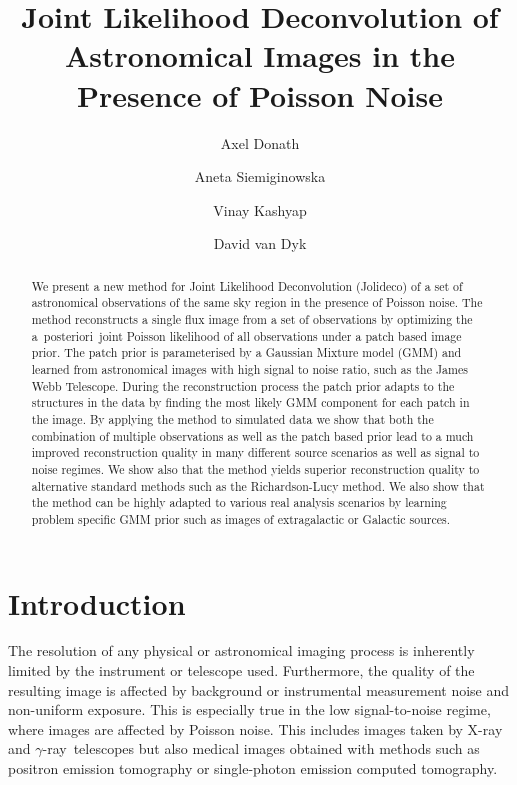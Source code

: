 \documentclass[twocolumn]{aastex631}
\newcommand{\aposteriori}{a~posteriori~}
\newcommand{\gammaray}{$\gamma$-ray\xspace}
\newcommand{\xray}{X-ray\xspace}
\begin{document}
    \title{Joint Likelihood Deconvolution of Astronomical Images in the Presence of Poisson Noise}

    \author[0000-0003-4568-7005]{Axel Donath}
    \author[0000-0002-0905-7375]{Aneta Siemiginowska}
    \author[0000-0002-3869-7996]{Vinay Kashyap} 
    \author[0000-0000-0000-0000]{David van Dyk}


    \begin{abstract}
        We present a new method for Joint Likelihood Deconvolution (Jolideco) of a set of astronomical observations of the same sky region in the presence of Poisson noise. The method reconstructs a single flux image from a set of observations by optimizing the \aposteriori joint Poisson likelihood of all observations under a patch based image prior. The patch prior is parameterised by a Gaussian Mixture model (GMM) and learned from astronomical images with high signal to noise ratio, such as the James Webb Telescope. During the reconstruction process the patch prior adapts  to the structures in the data by finding the most likely GMM component for each patch in the image. By applying the method to simulated data we show that both the combination of multiple observations as well as the patch based prior lead to a much improved reconstruction quality in many different source scenarios as well as signal to noise regimes. We show also that the method yields superior reconstruction quality to alternative standard methods such as the Richardson-Lucy method. We also show that the method can be highly adapted to various real analysis scenarios by learning problem specific GMM prior  such as images of extragalactic or Galactic sources.
    \end{abstract}



    \section{Introduction}
    The resolution of any physical or astronomical imaging process is inherently limited by the instrument or telescope used. Furthermore, the quality of the resulting image is affected by background or instrumental measurement noise and non-uniform exposure. This is especially true in the low signal-to-noise regime, where images are affected by Poisson noise. This includes images taken by \xray and \gammaray~telescopes but also medical images obtained with methods such as positron emission tomography or single-photon emission computed tomography.
\end{document}
